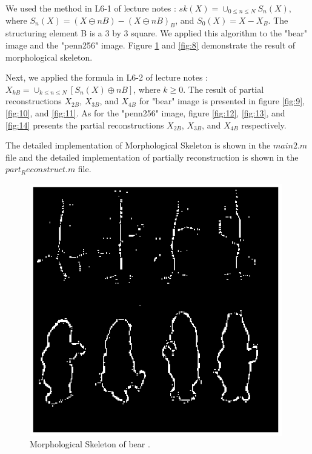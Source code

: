 \documentclass[paper=a4, fontsize=11pt]{scrartcl}
\begin{document}
We used the method in L6-1 of lecture notes : $sk(X) = \cup_{0 \leq n \leq N} S_n(X)$, where $S_n(X) = (X \ominus nB) - (X \ominus nB)_B$, and $S_0(X) = X - X_B$. The structuring element B is a 3 by 3 square. We applied this algorithm to the "bear" image and the "penn256" image. Figure \ref{fig:7} and \ref{fig:8} demonstrate the result of morphological skeleton. 

Next, we applied the formula in L6-2 of lecture notes : $X_{kB} =  \cup_{k \leq n \leq N} [ S_n(X) \oplus nB ] $, where $k \geq 0$. The result of  partial reconstructions $X_{2B}$, $X_{3B}$, and $X_{4B}$ for "bear" image is presented in figure  \ref{fig:9},  \ref{fig:10}, and  \ref{fig:11}. As for the "penn256" image, figure  \ref{fig:12},  \ref{fig:13}, and  \ref{fig:14} presents the partial reconstructions $X_{2B}$, $X_{3B}$, and $X_{4B}$ respectively.


The detailed implementation of Morphological Skeleton is shown in the $main2.m $ file and the detailed implementation of partially reconstruction is shown in the $part_Reconstruct.m$ file. 

\begin{figure}
	\centering
	\includegraphics[width=11cm]{SKbear.eps}
	\caption{Morphological Skeleton of bear .}
	\label{fig:7}
\end{figure}
\end{document}
